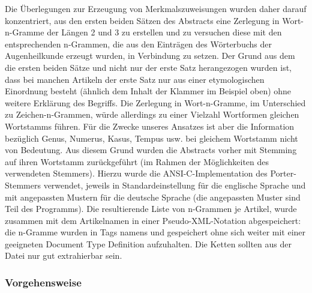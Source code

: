 \documentclass[pagesize,DIV=calc,12pt,draft]{scrreprt}
\begin{document}
Die Überlegungen zur Erzeugung von Merkmalszuweisungen wurden daher darauf konzentriert, aus den ersten beiden Sätzen des Abstracts eine Zerlegung in Wort-n-Gramme der Längen 2 und 3 zu erstellen und zu versuchen diese mit den entsprechenden n-Grammen, die aus den Einträgen des Wörterbuchs der Augenheilkunde erzeugt wurden, in Verbindung zu setzen. 
Der Grund aus dem die ersten beiden Sätze und nicht nur der erste Satz herangezogen wurden ist, dass bei manchen Artikeln der erste Satz nur aus einer etymologischen Einordnung besteht (ähnlich dem Inhalt der Klammer im Beispiel oben) ohne weitere Erklärung des Begriffs. 
Die Zerlegung in Wort-n-Gramme, im Unterschied zu Zeichen-n-Grammen, würde allerdings zu einer Vielzahl Wortformen gleichen Wortstamms führen.
Für die Zwecke unseres Ansatzes ist aber die Information bezüglich Genus, Numerus, Kasus, Tempus usw. bei gleichem Wortstamm nicht von Bedeutung. 
Aus diesem Grund wurden die Abstracts vorher mit Stemming auf ihren Wortstamm zurückgeführt (im Rahmen der Möglichkeiten des verwendeten Stemmers). 
Hierzu wurde die ANSI-C-Implementation des Porter-Stemmers verwendet, jeweils in Standardeinstellung für die englische Sprache und mit angepassten Mustern für die deutsche Sprache (die angepassten Muster sind Teil des Programms). 
Die resultierende Liste von n-Grammen je Artikel, wurde zusammen mit dem Artikelnamen in einer Pseudo-XML-Notation abgespeichert: die n-Gramme wurden in Tags namens und gespeichert ohne sich weiter mit einer geeigneten Document Type Definition aufzuhalten. 
Die Ketten sollten aus der Datei nur gut extrahierbar sein. 

\subsubsection{Vorgehensweise}
\end{document}
